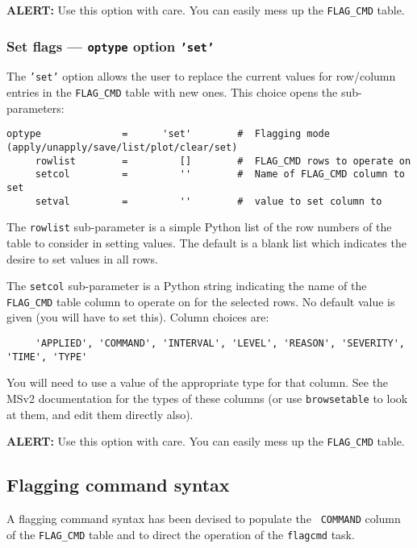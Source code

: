 {\bf ALERT:} Use this option with care.  You can easily mess up the
{\tt FLAG\_CMD} table.

\subsubsection{Set flags --- {\tt optype} option {\tt 'set'}}
\label{section:edit.flagcmd.optype.set}

The {\tt 'set'} option allows the user to replace the current values
for row/column entries in the {\tt FLAG\_CMD} table with new ones.
This choice opens the sub-parameters:
\small
\begin{verbatim}
optype              =      'set'        #  Flagging mode (apply/unapply/save/list/plot/clear/set)
     rowlist        =         []        #  FLAG_CMD rows to operate on
     setcol         =         ''        #  Name of FLAG_CMD column to set
     setval         =         ''        #  value to set column to
\end{verbatim}
\normalsize

The {\tt rowlist} sub-parameter is a simple Python list of the row
numbers of the table to consider in setting values.  The default is
a blank list which indicates the desire to set values in all rows.

The {\tt setcol} sub-parameter is a Python string indicating the name
of the {\tt FLAG\_CMD} table column to operate on for the selected 
rows.  No default value is given (you will have to set this).  Column
choices are:
\begin{verbatim}
     'APPLIED', 'COMMAND', 'INTERVAL', 'LEVEL', 'REASON', 'SEVERITY', 'TIME', 'TYPE'
\end{verbatim}
You will need to use a value of the appropriate type for that column.
See the MSv2 documentation for the types of these columns (or use 
{\tt browsetable} to look at them, and edit them directly also).

{\bf ALERT:} Use this option with care.  You can easily mess up the
{\tt FLAG\_CMD} table.

\subsection{Flagging command syntax}
\label{section:edit.flagcmd.syntax}

A flagging command syntax has been devised to populate the {\tt
COMMAND} column of the {\tt FLAG\_CMD} table and to direct the 
operation of the {\tt flagcmd} task.

